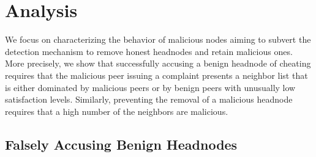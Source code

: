 \section{Analysis}
\label{sec:analysis}



We focus on characterizing the behavior of malicious nodes aiming to subvert the detection mechanism to remove honest headnodes and retain malicious ones. 
More precisely, we show that successfully accusing a benign headnode of cheating requires that the malicious peer issuing a complaint presents a neighbor list that is either dominated by malicious peers or by benign peers with unusually low satisfaction levels.
Similarly, preventing the removal of a malicious headnode requires that a high number of the  neighbors are malicious.



\subsection{Falsely Accusing Benign Headnodes}

